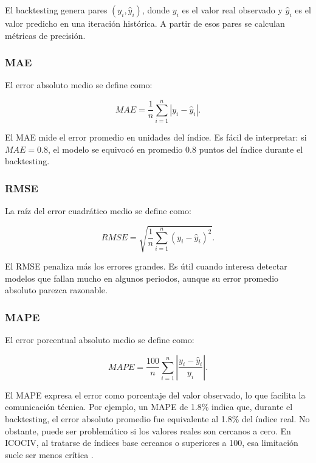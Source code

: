 El backtesting genera pares \((y_i, \hat{y}_i)\), donde \(y_i\) es el valor real observado y \(\hat{y}_i\) es el valor predicho en una iteración histórica. A partir de esos pares se calculan métricas de precisión.

\subsubsection{MAE}

El error absoluto medio se define como:

\begin{equation}
    MAE = \frac{1}{n}\sum_{i=1}^{n}|y_i-\hat{y}_i|.
    \label{eq:mae}
\end{equation}

El MAE mide el error promedio en unidades del índice. Es fácil de interpretar: si \(MAE = 0.8\), el modelo se equivocó en promedio 0.8 puntos del índice durante el backtesting.

\subsubsection{RMSE}

La raíz del error cuadrático medio se define como:

\begin{equation}
    RMSE = \sqrt{\frac{1}{n}\sum_{i=1}^{n}(y_i-\hat{y}_i)^2}.
    \label{eq:rmse}
\end{equation}

El RMSE penaliza más los errores grandes. Es útil cuando interesa detectar modelos que fallan mucho en algunos periodos, aunque su error promedio absoluto parezca razonable.

\subsubsection{MAPE}

El error porcentual absoluto medio se define como:

\begin{equation}
    MAPE = \frac{100}{n}\sum_{i=1}^{n}\left|\frac{y_i-\hat{y}_i}{y_i}\right|.
    \label{eq:mape}
\end{equation}

El MAPE expresa el error como porcentaje del valor observado, lo que facilita la comunicación técnica. Por ejemplo, un MAPE de 1.8\% indica que, durante el backtesting, el error absoluto promedio fue equivalente al 1.8\% del índice real. No obstante, puede ser problemático si los valores reales son cercanos a cero. En ICOCIV, al tratarse de índices base cercanos o superiores a 100, esa limitación suele ser menos crítica \parencite{hyndman_koehler2006}.


